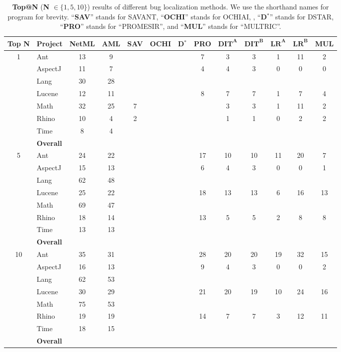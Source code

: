 \begin{table*}[!t]
	\centering
	\caption{\textbf{Top@N} (\textbf{N} $\in {\{1, 5, 10\}}$) results of different bug localization methods. We use the shorthand names for program for brevity. ``\textbf{SAV}'' stands for SAVANT, ``\textbf{OCHI}'' stands for OCHIAI, , ``\textbf{D$^{*}$}'' stands for DSTAR, ``\textbf{PRO}'' stands for ``PROMESIR'', and ``\textbf{MUL}'' stands for ``MULTRIC''.}
	\begin{tabular}{|c|l|c|c|c|c|c|c|c|c|c|c|c|}
		\hline
		\textbf{Top N} & \textbf{Project} & \textbf{NetML} & \textbf{AML} & \textbf{SAV} & \textbf{OCHI} & \textbf{D}$^{*}$ & \textbf{PRO} & $\textbf{DIT}^\textbf{A}$ & $\textbf{DIT}^\textbf{B}$ & $\textbf{LR}^\textbf{A}$ & $\textbf{LR}^\textbf{B}$ & \textbf{MUL}\\
		\hline\hline
		\multirow{8}{*}{1}      & Ant&13&9&&&&7&3&3&1&11&2\\
		& AspectJ&11&7&&&&4&4&3&0&0&0\\
		& Lang&30&28&&&&&&&&&\\
		& Lucene&12&11&&&&8&7&7&1&7&4\\
		& Math&32&25&7&&&&3&3&1&11&2\\
		& Rhino&10&4&2&&&&1&1&0&2&2\\
		& Time&8&4&&&&&&&&&\\
		\cline{2-13}
		& \textbf{Overall}&&&&&&&&&&&\\
		
		\hline
		\multirow{5}{*}{5} &Ant&24&22&&&&17&10&10&11&20&7\\ 
		& AspectJ& 15 & 13&&& & 6 & 4 &3&0&0&1\\
		& Lang&62&48&&&&&&&&&\\
		&Lucene&25&22&&&&18&13&13&6&16&13\\
		& Math&69&47&&&&&&&&&\\
		&Rhino&18&14&&&&13&5&5&2&8&8\\
		& Time&13&13&&&&&&&&&\\
		\cline{2-13}
		& \textbf{Overall}&&&&&&&&&&&\\
		\hline
		\multirow{5}{*}{10} &     Ant&35&31&&&&28&20&20&19&32&15\\
		&AspectJ&16&13&&&&9&4&3&0&0&2\\
		& Lang&62&53&&&&&&&&&\\
		&    Lucene&30&29&&&&21&20&19&10&24&16\\
		& Math&75&53&&&&&&&&&\\
		&   Rhino&19&19&&&&14&7&7&3&12&11\\
		& Time&18&15&&&&&&&&&\\
		\cline{2-13}
		&  {\textbf{Overall}}&&&&&&&&&&&\\
		\hline
	\end{tabular}
	\label{tab:result_top_N}
\end{table*}

